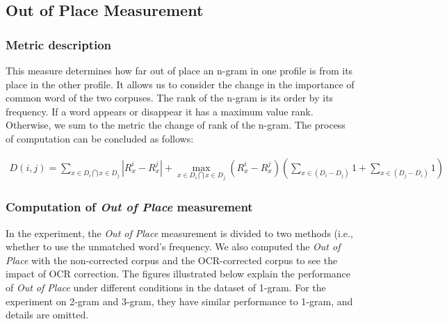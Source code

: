 \subsection{Out of Place Measurement}

\subsubsection{Metric description}

This measure determines how far out of place an n-gram in one profile is from its place in the other profile. It allows us to consider the change in the importance of common word of the two corpuses. The rank of the n-gram is its order by its frequency. If a word appears or disappear it has a maximum value rank. Otherwise, we sum to the metric the change of rank of the n-gram. The process of computation can be concluded as follows:

\begin{eqnarray}\label{outofplace}
	D(i, j) = \sum_{x \in D_i \bigcap x \in D_j} |R_x^i - R_x^j| + 
			\max_{x \in D_i \bigcap x \in D_j}(R_x^i - R_x^j) (\sum_{x \in (D_i - D_j)} 1 + \sum_{x \in (D_j - D_i)} 1)
\end{eqnarray}

\subsubsection{Computation of \emph{Out of Place} measurement}

In the experiment, the \emph{Out of Place} measurement is divided to two methods (i.e., whether to use the unmatched word's frequency. We also computed the \emph{Out of Place} with the non-corrected corpus and the OCR-corrected corpus to see the impact of OCR correction. The figures illustrated below explain the performance of \emph{Out of Place} under different conditions in the dataset of 1-gram. For the experiment on 2-gram and 3-gram, they have similar performance to 1-gram, and details are omitted.

